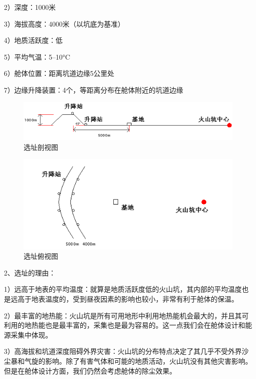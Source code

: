 2）深度：1000米

3）海拔高度：4000米（以坑底为基准）

4）地质活跃度：低

5）平均气温：5--10\si{\degreeCelsius}

6）舱体位置：距离坑道边缘5公里处

7）边缘升降装置：4个，等距离分布在舱体附近的坑道边缘
\vskip1cm
\begin{figure}[H]
  \centering
  \includegraphics[width=\textwidth]{figure/location-sideview.png}
  \caption{选址剖视图}
\end{figure}

\begin{figure}[H]
\label{chp:location:end}
  \centering
  \includegraphics[width=\textwidth]{figure/location-topview.png}
  \caption{选址俯视图}
\end{figure}

2、选址的理由：

1）远高于地表的平均温度：就算是地质活跃度低的火山坑，其内部的平均温度也是远高于地表温度的，受到昼夜因素的影响也较小，非常有利于舱体的保温。

2）最丰富的地热能：火山坑是所有可用地形中利用地热能机会最大的，并且其可利用的地热能也是最丰富的，采集也是最为容易的。这一点我们会在舱体设计和能源采集中体现。

3）高海拔和坑道深度阻碍外界灾害：火山坑的分布特点决定了其几乎不受外界沙尘暴和气旋的影响。除了有害气体和可能的地质活动，火山坑没有其他灾害影响。但是在舱体设计方面，我们仍然会考虑舱体的除尘效果。
